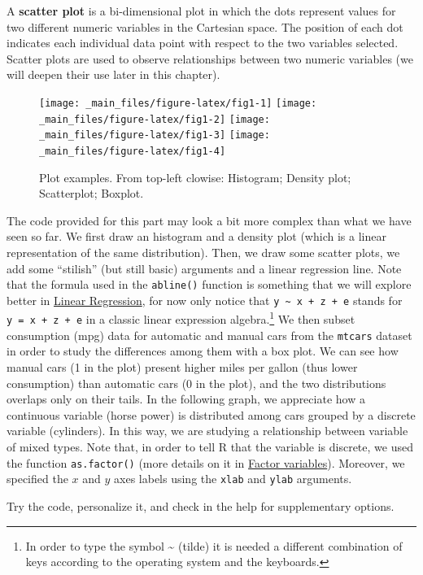 \documentclass[
]{article}
\begin{document}
A \textbf{scatter plot} is a bi-dimensional plot in which the dots represent
values for two different numeric variables in the Cartesian space. The
position of each dot indicates each individual data point with respect
to the two variables selected. Scatter plots are used to observe
relationships between two numeric variables (we will deepen their use
later in this chapter).

\begin{figure}[H]
\texttt{[image: \_main\_files/figure-latex/fig1-1]} \texttt{[image: \_main\_files/figure-latex/fig1-2]} \texttt{[image: \_main\_files/figure-latex/fig1-3]} \texttt{[image: \_main\_files/figure-latex/fig1-4]} \caption{Plot examples. From top-left clowise: Histogram; Density plot; Scatterplot; Boxplot.}\label{fig:fig1}
\end{figure}

The code provided for this part may look a bit more complex than what we
have seen so far. We first draw an histogram and a density plot (which
is a linear representation of the same distribution). Then, we draw some
scatter plots, we add some ``stilish'' (but still basic) arguments and a
linear regression line. Note that the formula used in the \texttt{abline()}
function is something that we will explore better in \protect\hyperlink{linear-regression}{Linear
Regression}, for now only notice that \texttt{y\ \textasciitilde{}\ x\ +\ z\ +\ e} stands for
\texttt{y\ =\ x\ +\ z\ +\ e} in a classic linear expression algebra.\footnote{In order to type the symbol \textasciitilde{} (tilde) it is needed a different
  combination of keys according to the operating system and the
  keyboards.} We then
subset consumption (mpg) data for automatic and manual cars from the
\texttt{mtcars} dataset in order to study the differences among them with a box
plot. We can see how manual cars (1 in the plot) present higher miles
per gallon (thus lower consumption) than automatic cars (0 in the plot),
and the two distributions overlaps only on their tails. In the following
graph, we appreciate how a continuous variable (horse power) is
distributed among cars grouped by a discrete variable (cylinders). In
this way, we are studying a relationship between variable of mixed
types. Note that, in order to tell R that the variable is discrete, we
used the function \texttt{as.factor()} (more details on it in \protect\hyperlink{factor-variables}{Factor
variables}). Moreover, we specified the \(x\) and \(y\) axes labels using
the \texttt{xlab} and \texttt{ylab} arguments.

Try the code, personalize it, and check in the help for supplementary
options.
\end{document}

